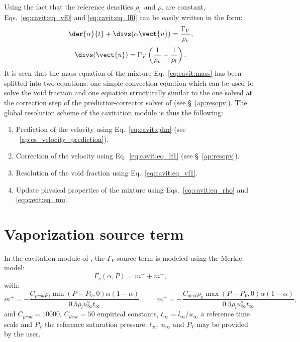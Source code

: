 Using the fact that the reference densities $\rho_v$ and $\rho_l$ are
constant, Eqs.~\eqref{eq:cavit:eq_vf0} and \eqref{eq:cavit:eq_lf0} can be easily
written in the form:
\begin{equation}
\label{eq:cavit:eq_vf1}
\der{\alpha}{t} + \divs(\alpha\vect{u}) =
\dfrac{\Gamma_V}{\rho_v},
\end{equation}
%
\begin{equation}
\label{eq:cavit:eq_lf1}
\divs(\vect{u})=\Gamma_V\left(\frac{1}{\rho_v}-\frac{1}{\rho_l}\right).
\end{equation}
It is seen that the mass equation of the mixture Eq.~\eqref{eq:cavit:mass}
has been splitted into two equations: one simple convection equation
which can be used to solve the void fraction and one equation
structurally similar to the one solved at the correction step of the
predictior-corrector solver of \CS (see \S~\ref{ap:resopv}).
The global resolution scheme of the cavitation module is thus the
following:
\begin{enumerate}
\item Prediction of the velocity using Eq.~\eqref{eq:cavit:qdm} (see
\appendixname~\ref{ap:cs_velocity_prediction}).
\item Correction of the velocity using Eq.~\eqref{eq:cavit:eq_lf1} (see
\S~\ref{ap:resopv}).
\item Resolution of the void fraction using Eq.~\eqref{eq:cavit:eq_vf1}.
\item Update physical properties of the mixture using
Eqs.~\eqref{eq:cavit:eq_rho} and \eqref{eq:cavit:eq_mu}.
\end{enumerate}
%
\section{Vaporization source term}
\label{sec:cavit:source_term}
In the cavitation module of \CS, the $\Gamma_V$ source term is
modeled using the Merkle model:
\begin{equation*}
\Gamma_v \left(\alpha, P\right) = m^+ + m^-,
\end{equation*}
 with:
\begin{equation}
m^+ = -\dfrac{C_{prod} \rho_l \min \left( P-P_V,0
\right)\alpha(1-\alpha)}{0.5\rho_lu_\infty^2t_\infty},\qquad
m^- = -\dfrac{C_{dest} \rho_v \max \left( P-P_V,0
\right)\alpha(1-\alpha)}{0.5\rho_lu_\infty^2t_\infty},
\end{equation}
and
$ C_{prod} = 10000, \, C_{dest} = 50 $
empirical constants, $t_\infty=l_\infty/u_\infty$ a reference time
scale and $P_V$ the reference saturation pressure. $l_\infty$,
$u_\infty$ and $P_V$ may be provided by the user.
%
